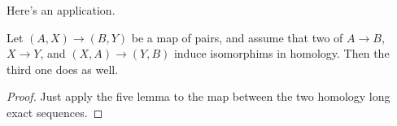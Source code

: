 Here's an application.
\begin{prop}
Let $(A,X)\to(B,Y)$ be a map of pairs, and assume that two of 
$A\to B$, $X\to Y$, and $(X,A)\to(Y,B)$ induce isomorphims in homology. 
Then the third one does as well.
\end{prop}
\begin{proof}
Just apply the five lemma to the map between the two homology long exact 
sequences.
\end{proof}
